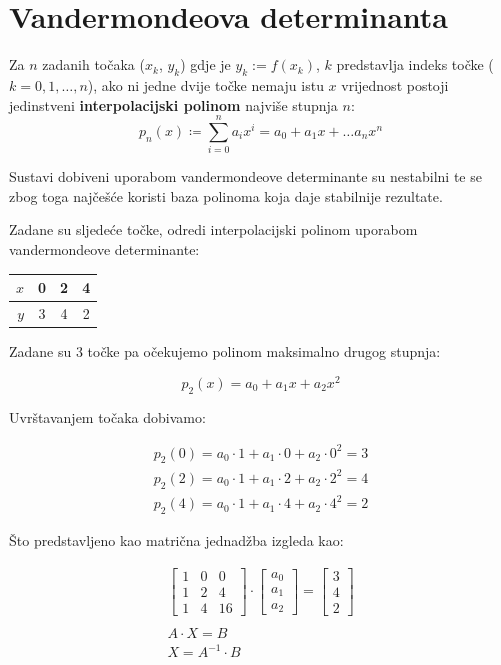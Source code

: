 \section{Vandermondeova determinanta}

Za $n$ zadanih točaka ($x_k$, $y_k$) gdje je $y_k := f(x_k)$, $k$ predstavlja indeks točke ($k = 0, 1, \dots, n$), ako ni jedne dvije točke nemaju istu $x$ vrijednost postoji jedinstveni \textbf{interpolacijski polinom} najviše stupnja $n$:
\begin{equation}
    p_n(x)\coloneq \sum_{i=0}^na_ix^i= a_0 + a_1x + \dots a_nx^n
\end{equation}

Sustavi dobiveni uporabom vandermondeove determinante su nestabilni te se zbog toga najčešće koristi baza polinoma koja daje stabilnije rezultate.

\begin{example}
    Zadane su sljedeće točke, odredi interpolacijski polinom uporabom vandermondeove determinante:

    \center
    \begin{tabular}{r|c|c|c}
        $x$&0&2&4\\
        \hline
        $y$&3&4&2
    \end{tabular}
\end{example}

\begin{multicols}{2}

Zadane su 3 točke pa očekujemo polinom maksimalno drugog stupnja:

$$
    p_2(x) = a_0 + a_1x + a_2x^2
$$

Uvrštavanjem točaka dobivamo:

\begin{gather*}
p_2(0) = a_0\cdot 1 + a_1\cdot 0 + a_2\cdot 0^2 = 3\\
p_2(2) = a_0\cdot 1 + a_1\cdot 2 + a_2\cdot 2^2 = 4\\
p_2(4) = a_0\cdot 1 + a_1\cdot 4 + a_2\cdot 4^2 = 2
\end{gather*}

\newcolumn

Što predstavljeno kao matrična jednadžba izgleda kao:

\begin{gather*}
\begin{bmatrix}
1 & 0 & 0 \\
1 & 2 & 4 \\
1 & 4 & 16
\end{bmatrix}
\cdot
\begin{bmatrix}
a_0 \\ a_1 \\ a_2
\end{bmatrix}
=
\begin{bmatrix}
3 \\ 4 \\ 2
\end{bmatrix} \\\\
A\cdot X = B \\
X = A^{-1} \cdot B
\end{gather*}

\end{multicols}

